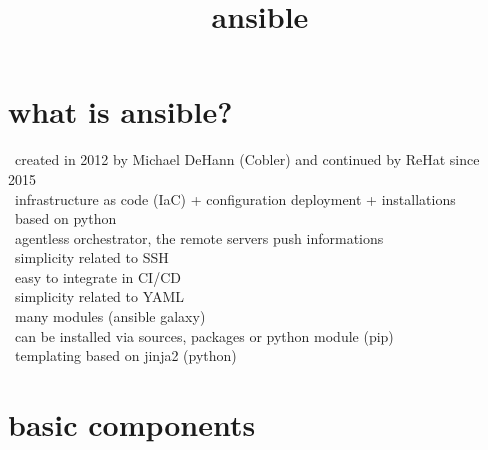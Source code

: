 \documentclass{refcard}
\title{ansible}
\begin{document}
\maketitle

\section{what is ansible?}

\textbullet\ created in 2012 by Michael DeHann (Cobler) and continued by ReHat since 2015\\
\textbullet\ infrastructure as code (IaC) + configuration deployment + installations\\
\textbullet\ based on python\\
\textbullet\ agentless orchestrator, the remote servers push informations \\
\textbullet\ simplicity related to SSH\\
\textbullet\ easy to integrate in CI/CD\\
\textbullet\ simplicity related to YAML\\
\textbullet\ many modules (ansible galaxy)\\
\textbullet\ can be installed via sources, packages or python module (pip)\\
\textbullet\ templating based on jinja2 (python)\\

\section{basic components}
\end{document}
